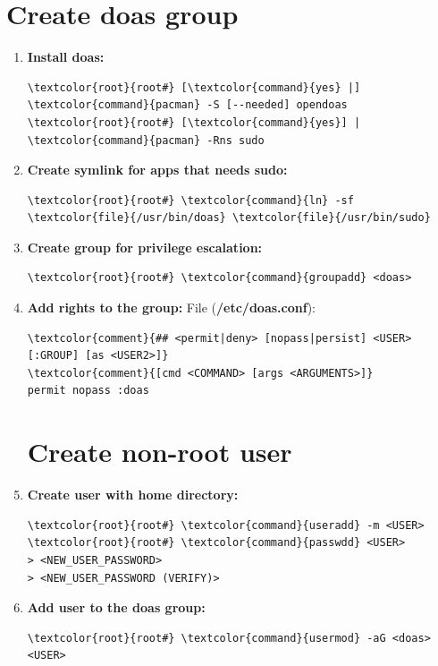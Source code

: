 \documentclass[10pt, a4paper, onecolumn, oneside, titlepage, openany]{book}
\begin{document}
\section{Create doas group}
\begin{enumerate}
    \item \textbf{Install doas:}
\begin{Verbatim}[commandchars=\\\{\}]
\textcolor{root}{root#} [\textcolor{command}{yes} |] \textcolor{command}{pacman} -S [--needed] opendoas
\textcolor{root}{root#} [\textcolor{command}{yes}] | \textcolor{command}{pacman} -Rns sudo
\end{Verbatim}
    \item \textbf{Create symlink for apps that needs sudo:}
\begin{Verbatim}[commandchars=\\\{\}]
\textcolor{root}{root#} \textcolor{command}{ln} -sf \textcolor{file}{/usr/bin/doas} \textcolor{file}{/usr/bin/sudo}
\end{Verbatim}
    \item \textbf{Create group for privilege escalation:}
\begin{Verbatim}[commandchars=\\\{\}]
\textcolor{root}{root#} \textcolor{command}{groupadd} <doas>
\end{Verbatim}
    \item \textbf{Add rights to the group:}
\newline File (\textbf{\textcolor{file}{/etc/doas.conf}}):
\begin{Verbatim}[commandchars=\\\{\}]
\textcolor{comment}{## <permit|deny> [nopass|persist] <USER>[:GROUP] [as <USER2>]}
\textcolor{comment}{[cmd <COMMAND> [args <ARGUMENTS>]}
permit nopass :doas
\end{Verbatim}

\section{Create non-root user}
    \item \textbf{Create user with home directory:}
\begin{Verbatim}[commandchars=\\\{\}]
\textcolor{root}{root#} \textcolor{command}{useradd} -m <USER>
\textcolor{root}{root#} \textcolor{command}{passwdd} <USER>
> <NEW_USER_PASSWORD>
> <NEW_USER_PASSWORD (VERIFY)>
\end{Verbatim}
    \item \textbf{Add user to the doas group:}
\begin{Verbatim}[commandchars=\\\{\}]
\textcolor{root}{root#} \textcolor{command}{usermod} -aG <doas> <USER>
\end{Verbatim}
\end{enumerate}
\end{document}
